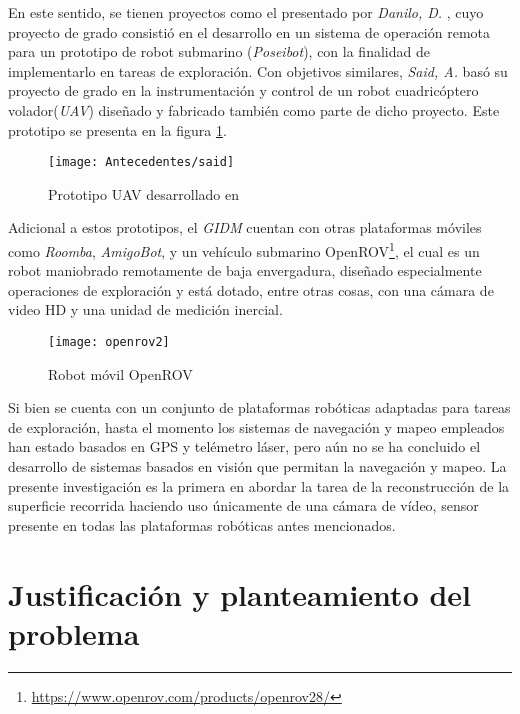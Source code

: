  En este sentido, se tienen proyectos como el presentado por \textit{Danilo, D.} \cite{danilo}, cuyo proyecto de grado consistió en el desarrollo en un sistema de operación remota para un prototipo de robot submarino (\textit{Poseibot}), con la finalidad de implementarlo en tareas de exploración. Con objetivos similares, \textit{Said, A.} \cite{said} basó su proyecto de grado en la instrumentación y control de un robot cuadricóptero volador(\textit{UAV}) diseñado y fabricado también como parte de dicho proyecto. Este prototipo se presenta en la figura \ref{imagen:said}.
\begin{figure}[H]
	\centering
	\texttt{[image: Antecedentes/said]}
	\caption[Prototipo UAV desarrollado en  \cite{said}]{Prototipo UAV desarrollado en  \cite{said}}
	\label{imagen:said}
\end{figure}

Adicional a estos prototipos,  el \textit{GIDM} cuentan con otras plataformas móviles como \textit{Roomba}, \textit{AmigoBot}, y un vehículo submarino OpenROV\footnote{ \url{https://www.openrov.com/products/openrov28/}}, el cual es un robot maniobrado remotamente de baja envergadura, diseñado especialmente operaciones de exploración y está dotado, entre otras cosas, con una cámara de video HD y una unidad de medición inercial.

\begin{figure}[H]
	\centering
	\texttt{[image: openrov2]}
	\caption[Robot móvil OpenROV]{Robot móvil OpenROV}
	\label{imagen:openrov}
\end{figure}

Si bien se cuenta con un conjunto de plataformas robóticas adaptadas para tareas de exploración, hasta el momento los sistemas de navegación y mapeo empleados han estado basados en GPS y telémetro láser, pero aún no se ha concluido el desarrollo de sistemas basados en visión que permitan la navegación y mapeo. La presente investigación es la primera en abordar la tarea de la reconstrucción de la superficie recorrida haciendo uso únicamente de una cámara de vídeo, sensor presente en todas las plataformas robóticas antes mencionados.

\section{Justificación y planteamiento del problema}

